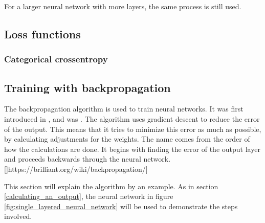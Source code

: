 For a larger neural network with more layers, the same process is still used. 


\subsection{Loss functions}
\label{loss_function}

\subsubsection{Categorical crossentropy}
\label{categorical-crossentropy}

\subsection{Training with backpropagation}
\label{training_with_backpropagation}

The backpropagation algorithm is used to train neural networks. It was first introduced in \cite{werbos_beyond_1974}, and \cite{rumelhart_learning_1986} was . The algorithm uses gradient descent to reduce the error of the output. This means that it tries to minimize this error as much as possible, by calculating adjustments for the weights. The name comes from the order of how the calculations are done. It begins with finding the error of the output layer and proceeds backwards through the neural network. 
[]https://brilliant.org/wiki/backpropagation/]


This section will explain the algorithm by an example. As in section \ref{calculating_an_output}, the neural network in figure \ref{fig:single_layered_neural_network} will be used to demonstrate the steps involved. 

